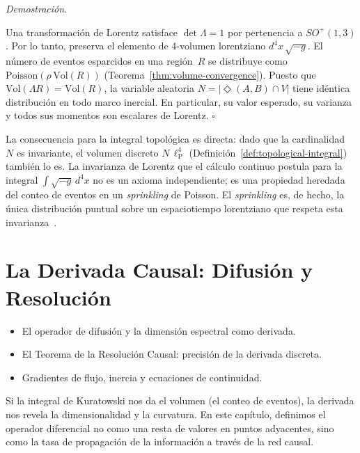 \documentclass[11pt, a4paper, openany]{book}
\newcommand{\lP}{\ell_{\mathrm{P}}}
\newcommand{\diam}[2]{\Diamond(#1,#2)}
\newenvironment{introduction}[1][Sinopsis del M\'odulo]{%
  \begin{tcolorbox}[
    enhanced,colback=structure!5,colframe=structure,
    colbacktitle=structure,coltitle=white,
    fonttitle=\small\bfseries,title={#1},
    arc=2pt,boxrule=0.7pt,
    left=8pt,right=8pt,top=6pt,bottom=6pt,
    before skip=12pt,after skip=12pt
  ]\itshape\begin{itemize}[leftmargin=*,itemsep=2pt,parsep=0pt]
}{%
  \end{itemize}\end{tcolorbox}
}
\renewenvironment{proof}[1][Demostraci\'on]{%
  \par\noindent\textit{#1.}\quad
}{\hfill$\square$\par\medskip}
\begin{document}
\begin{proof}
Una transformaci\'on de Lorentz satisface $\det\Lambda = 1$ por
pertenencia a $SO^+(1,3)$. Por lo tanto, preserva el elemento de
4-volumen lorentziano $d^4x\,\sqrt{-g}$. El n\'umero de eventos
esparcidos en una regi\'on~$R$ se distribuye como
$\mathrm{Poisson}(\rho\,\mathrm{Vol}(R))$
(Teorema~\ref{thm:volume-convergence}). Puesto que
$\mathrm{Vol}(\Lambda R) = \mathrm{Vol}(R)$, la variable aleatoria
$N = |\diam{A}{B} \cap V|$ tiene id\'entica distribuci\'on en todo
marco inercial. En particular, su valor esperado, su varianza y
todos sus momentos son escalares de Lorentz.
\end{proof}

\noindent
La consecuencia para la integral topol\'ogica es directa: dado que
la cardinalidad~$N$ es invariante, el volumen discreto
$N\,\lP^4$ (Definici\'on~\ref{def:topological-integral}) tambi\'en
lo es. La invarianza de Lorentz que el c\'alculo continuo postula
para la integral $\int\!\sqrt{-g}\,d^4x$ no es un axioma
independiente; es una propiedad heredada del conteo de eventos en un
\emph{sprinkling} de Poisson. El \emph{sprinkling} es, de hecho, la
\'unica distribuci\'on puntual sobre un espaciotiempo lorentziano que
respeta esta invarianza~\cite{bombelli2009}.

\chapter{La Derivada Causal: Difusi\'on y Resoluci\'on}

\begin{introduction}
  \item El operador de difusi\'on y la dimensi\'on espectral como derivada.
  \item El Teorema de la Resoluci\'on Causal: precisi\'on de la derivada
        discreta.
  \item Gradientes de flujo, inercia y ecuaciones de continuidad.
\end{introduction}

Si la integral de Kuratowski nos da el volumen (el conteo de eventos),
la derivada nos revela la dimensionalidad y la curvatura. En este
cap\'itulo, definimos el operador diferencial no como una resta de
valores en puntos adyacentes, sino como la tasa de propagaci\'on de
la informaci\'on a trav\'es de la red causal.
\end{document}
